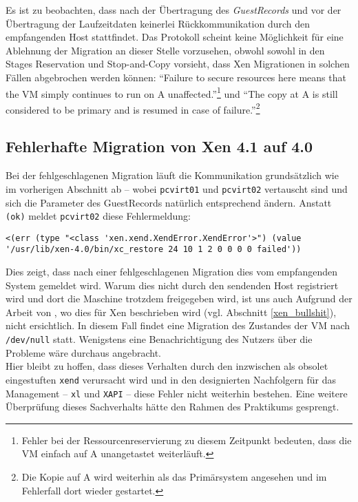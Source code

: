 \label{xen_bullshit}
Es ist zu beobachten, dass nach der Übertragung des \emph{GuestRecords} und vor der Übertragung der Laufzeitdaten keinerlei Rückkommunikation durch den empfangenden Host stattfindet. Das Protokoll scheint keine Möglichkeit für eine Ablehnung der Migration an dieser Stelle vorzusehen, obwohl \cite{clark2005live} sowohl in den Stages Reservation und Stop-and-Copy vorsieht, dass Xen Migrationen in solchen Fällen abgebrochen werden können: ``Failure to secure resources here means that the VM simply continues to run on A unaffected.''\footnote{Fehler bei der Ressourcenreservierung zu diesem Zeitpunkt bedeuten, dass die VM einfach auf A unangetastet weiterläuft.}\cite{clark2005live} und ``The copy at A is still considered to be primary and is resumed in case of failure.''\footnote{Die Kopie auf A wird weiterhin als das Primärsystem angesehen und im Fehlerfall dort wieder gestartet.}\cite{clark2005live}


\subsection{Fehlerhafte Migration von Xen 4.1 auf 4.0}
Bei der fehlgeschlagenen Migration läuft die Kommunikation grundsätzlich wie im vorherigen Abschnitt ab -- wobei \verb#pcvirt01# und \verb#pcvirt02# vertauscht sind und sich die Parameter des GuestRecords natürlich entsprechend ändern. Anstatt \verb#(ok)# meldet \verb#pcvirt02# diese Fehlermeldung:
\setupVerbatimOut
\begin{verbatim}
<(err (type "<class 'xen.xend.XendError.XendError'>") (value '/usr/lib/xen-4.0/bin/xc_restore 24 10 1 2 0 0 0 0 failed'))
\end{verbatim}

Dies zeigt, dass nach einer fehlgeschlagenen Migration dies vom empfangenden System gemeldet wird. Warum dies nicht durch den sendenden Host registriert wird und dort die Maschine trotzdem freigegeben wird, ist uns auch Aufgrund der Arbeit von \cite{clark2005live}, wo dies für Xen beschrieben wird (vgl. Abschnitt \ref{xen_bullshit}), nicht ersichtlich. In diesem Fall findet eine Migration des Zustandes der VM nach \verb#/dev/null# statt. Wenigstens eine Benachrichtigung des Nutzers über die Probleme wäre durchaus angebracht.
\\
Hier bleibt zu hoffen, dass dieses Verhalten durch den inzwischen als obsolet eingestuften \verb#xend# verursacht wird und in den designierten Nachfolgern für das Management -- \verb#xl# und \verb#XAPI# -- diese Fehler nicht weiterhin bestehen. Eine weitere Überprüfung dieses Sachverhalts hätte den Rahmen des Praktikums gesprengt.

